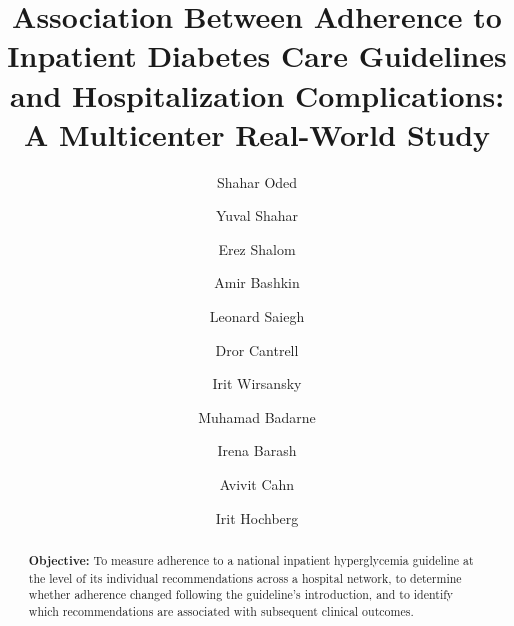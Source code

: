 \documentclass[preprint,12pt]{elsarticle}
\begin{document}
\begin{frontmatter}

\title{Association Between Adherence to Inpatient Diabetes Care Guidelines
and Hospitalization Complications: A Multicenter Real-World Study}

\author[aff1]{Shahar Oded}
\author[aff1]{Yuval Shahar}
\author[aff1]{Erez Shalom}
\author[aff2,aff3]{Amir Bashkin}
\author[aff4,aff5]{Leonard Saiegh}
\author[aff6]{Dror Cantrell}
\author[aff7]{Irit Wirsansky}
\author[aff2,aff8]{Muhamad Badarne}
\author[aff9]{Irena Barash}
\author[aff10,aff11]{Avivit Cahn}
\author[aff4,aff7]{Irit Hochberg}

\address[aff1]{Medical Informatics Research Center,
Ben-Gurion University of the Negev, Beer Sheva, Israel}

\address[aff2]{Azrieli Faculty of Medicine,
Bar-Ilan University, Safed, Israel}

\address[aff3]{Endocrinology and Diabetes Unit,
Galilee Medical Center, Nahariya, Israel}

\address[aff4]{Bruce Rappaport Faculty of Medicine,
Technion--Israel Institute of Technology, Haifa, Israel}

\address[aff5]{Endocrinology Institute,
Bnai Zion Medical Center, Haifa, Israel}

\address[aff6]{Internal Medicine Department C,
Shamir Medical Center, Beer Yaakov, Israel}

\address[aff7]{Endocrinology Unit,
Hillel Yaffe Medical Center, Hadera, Israel}

\address[aff8]{Endocrinology and Diabetes Service,
Tzafon Medical Center, Ramat Poriya, Israel}

\address[aff9]{Internal Medicine Department C,
Barzilai Medical Center, Ashkelon, Israel}

\address[aff10]{Internal Medicine Department A,
Hadassah Ein Kerem, Jerusalem, Israel}

\address[aff11]{Faculty of Medicine,
Hadassah Hebrew University Hospital, Jerusalem, Israel}

\begin{abstract}

\textbf{Objective:}
To measure adherence to a national inpatient hyperglycemia guideline at the
level of its individual recommendations across a hospital network, to
determine whether adherence changed following the guideline's introduction,
and to identify which recommendations are associated with subsequent
clinical outcomes.


\end{abstract}
\end{frontmatter}
\end{document}
